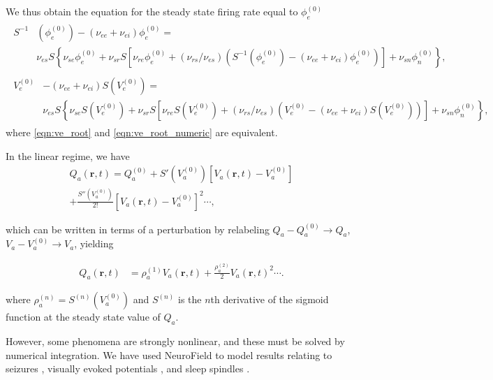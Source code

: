 \documentclass[preprint,review,10pt,authoryear,letterpaper]{elsarticle}
\begin{document}
We thus obtain the equation for the steady state firing rate equal to $\phi_e^{(0)}$ \cite{Robinson:04aa}
\begin{align}
	\label{eqn:ve_root}
	\begin{split}
	S^{-1}&(\phi_e^{(0)})-(\nu_{ee}+\nu_{ei})\phi_e^{(0)} = \\ &\nu_{es}S\left\{\nu_{se}\phi_e^{(0)}+\nu_{sr}S\left[\nu_{re}\phi_e^{(0)}+(\nu_{rs}/\nu_{es})\left(S^{-1}(\phi_e^{(0)})-(\nu_{ee}+\nu_{ei})\phi_e^{(0)}\right)\right]+\nu_{sn}\phi_n^{(0)}\right\}, 
\end{split}\\[16pt]
	\label{eqn:ve_root_numeric}
	\begin{split}
	V_e^{(0)}&-(\nu_{ee}+\nu_{ei})S(V_e^{(0)})=\\ &\nu_{es}S\left\{\nu_{se}S(V_e^{(0)})+\nu_{sr}S\left[\nu_{re}S(V_e^{(0)})+(\nu_{rs}/\nu_{es})\left(V_e^{(0)}-(\nu_{ee}+\nu_{ei})S(V_e^{(0)})\right)\right]+\nu_{sn}\phi_n^{(0)}\right\},
\end{split}
\end{align}
where \eqref{eqn:ve_root} and \eqref{eqn:ve_root_numeric} are equivalent.

In the linear regime, we have
\begin{align}
Q_a(\mathbf{r},t) = Q_a^{(0)} + S'\left(V_a^{(0)}\right) \left[V_a(\mathbf{r},t)-V_a^{(0)}\right] \\
+ \frac{S''\left(V_a^{(0)}\right)}{2!} \left[V_a(\mathbf{r},t)-V_a^{(0)}\right]^2 \cdots ,
\end{align}

which can be written in terms of a perturbation by relabeling $Q_a-Q_a^{(0)} \rightarrow Q_a $, $V_a-V_a^{(0)} \rightarrow V_a$, yielding

\begin{align}
\label{eqn:q_series}
Q_a(\mathbf{r},t) &= \rho_a^{(1)} V_a(\mathbf{r},t) + \frac{\rho_a^{(2)}}{2} V_a(\mathbf{r},t)^2 \cdots .
\end{align}


where $\rho_a^{(n)} = S^{(n)}\left(V_a^{(0)}\right)$ and $S^{(n)}$ is the $n$th derivative of the sigmoid function at the steady state value of $Q_a$. 

However, some phenomena are strongly nonlinear, and these must be solved by numerical integration. We have used NeuroField to model results relating to seizures \citep{Roberts2008}, visually evoked potentials \citep{Roberts2012a}, and sleep spindles \citep{Abeysuriya2013,Abeysuriya2013a}. 
\end{document}

